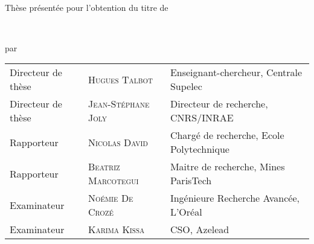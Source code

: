 
\begin{titlepage}

\begin{addmargin}[-1cm]{-3cm}
\begin{center}

\hfill
\vfill

\large
\myUni \\
\myDepartment 
\normalsize

\vfill

Thèse présentée pour l'obtention du titre de \\

\large \myDegree
\normalsize

\vfill

\begingroup
\color{Maroon}\spacedallcaps{\myTitle} \\ \bigskip %
\mySubtitle
\endgroup

par

\large
\spacedlowsmallcaps{\myName} %
\normalsize
\vfill


\myTime

\begin{tabularx}{\linewidth}{lll}
    Directeur de thèse & \textsc{Hugues Talbot} & Enseignant-chercheur, Centrale Supelec\\
    Directeur de thèse & \textsc{Jean-Stéphane Joly} & Directeur de recherche, CNRS/INRAE\\
    Rapporteur & \textsc{Nicolas David} & Chargé de recherche, Ecole Polytechnique\\ %
    Rapporteur & \textsc{Beatriz Marcotegui} & Maitre de recherche, Mines ParisTech\\
    Examinateur & \textsc{Noémie De Crozé} & Ingénieure Recherche Avancée, L'Oréal\\ %
    Examinateur & \textsc{Karima Kissa} & CSO, Azelead
\end{tabularx}

\vfill

\end{center}
\end{addmargin}

\end{titlepage}